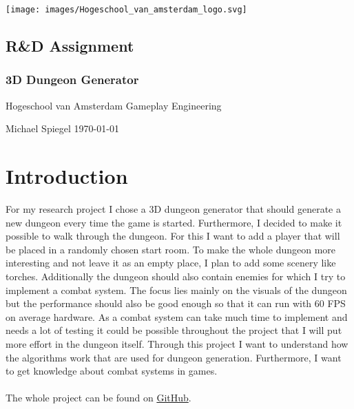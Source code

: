 \documentclass[a4paper,11pt,oneside]{scrreprt}
\begin{document}
\nocite{*}

\thispagestyle{empty}
\begin{titlepage}
  \begin{flushright}
  \texttt{[image: images/Hogeschool\_van\_amsterdam\_logo.svg]}
  \end{flushright}
  \begin{flushleft}
  \section*{R\&D Assignment}
  \subsection*{3D Dungeon Generator}

  \vspace{1cm}
  Hogeschool van Amsterdam\newline
  Gameplay Engineering

  \vspace{0.5cm}

  Michael Spiegel\newline
  \today
  \end{flushleft}
\end{titlepage}

\tableofcontents

\chapter{Introduction}
For my research project I chose a 3D dungeon generator that should generate a new dungeon every time the game is started. Furthermore, I decided to make it possible to walk through the dungeon. For this I want to add a player that will be placed in a randomly chosen start room. To make the whole dungeon more interesting and not leave it as an empty place, I plan to add some scenery like torches. Additionally the dungeon should also contain enemies for which I try to implement a combat system. The focus lies mainly on the visuals of the dungeon but the performance should also be good enough so that it can run with 60 FPS on average hardware. As a combat system can take much time to implement and needs a lot of testing it could be possible throughout the project that I will put more effort in the dungeon itself. Through this project I want to understand how the algorithms work that are used for dungeon generation. Furthermore, I want to get knowledge about combat systems in games.\\
\\
The whole project can be found on \href{https://github.com/Smightym8/3DDungeonGenerator}{GitHub}.
\end{document}
